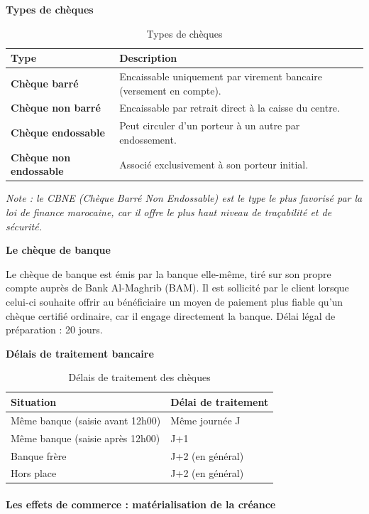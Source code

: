 \documentclass[12pt,a4paper]{report}
\begin{document}
\medskip\textbf{Types de chèques}

\begin{table}[h!]
\centering
\begin{tabularx}{\textwidth}{>{\bfseries}l X}
\toprule
Type & Description \\
\midrule
Chèque barré & Encaissable uniquement par virement bancaire (versement en compte). \\
Chèque non barré & Encaissable par retrait direct à la caisse du centre. \\
Chèque endossable & Peut circuler d'un porteur à un autre par endossement. \\
Chèque non endossable & Associé exclusivement à son porteur initial. \\
\bottomrule
\end{tabularx}
\caption{Types de chèques}
\end{table}

\textit{Note : le CBNE (Chèque Barré Non Endossable) est le type le plus favorisé par la loi de finance marocaine, car il offre le plus haut niveau de traçabilité et de sécurité.}

\medskip\textbf{Le chèque de banque}

Le chèque de banque est émis par la banque elle-même, tiré sur son propre compte auprès de Bank Al-Maghrib (BAM). Il est sollicité par le client lorsque celui-ci souhaite offrir au bénéficiaire un moyen de paiement plus fiable qu'un chèque certifié ordinaire, car il engage directement la banque. Délai légal de préparation : 20 jours.

\medskip\textbf{Délais de traitement bancaire}

\begin{table}[h!]
\centering
\begin{tabularx}{\textwidth}{X X}
\toprule
Situation & Délai de traitement \\
\midrule
Même banque (saisie avant 12h00) & Même journée J \\
Même banque (saisie après 12h00) & J+1 \\
Banque frère & J+2 (en général) \\
Hors place & J+2 (en général) \\
\bottomrule
\end{tabularx}
\caption{Délais de traitement des chèques}
\end{table}

\paragraph{Les effets de commerce : matérialisation de la créance}
\end{document}
